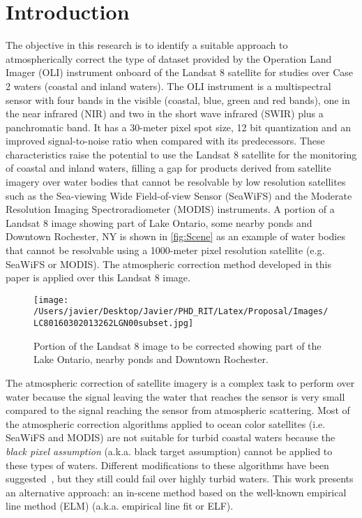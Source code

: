 \documentclass[]{spie}  %
\begin{document}
\section{Introduction} 
The objective in this research is to identify a suitable approach to atmospherically correct the type of dataset provided by the Operation Land Imager (OLI) instrument onboard of the Landsat 8 satellite for studies over Case 2 waters (coastal and inland waters). The OLI instrument is a multispectral sensor with four bands in the visible (coastal, blue, green and red bands), one in the near infrared (NIR) and two in the short wave infrared (SWIR) plus a panchromatic band. It has a 30-meter pixel spot size, 12 bit quantization and an improved signal-to-noise ratio when compared with its predecessors. These characteristics raise the potential to use the Landsat 8 satellite for the monitoring of coastal and inland waters, filling a gap for products derived from satellite imagery over water bodies that cannot be resolvable by low resolution satellites such as the Sea-viewing Wide Field-of-view Sensor (SeaWiFS) and the Moderate Resolution Imaging Spectroradiometer (MODIS) instruments. A portion of a Landsat 8 image showing part of Lake Ontario, some nearby ponds and Downtown Rochester, NY is shown in \autoref{fig:Scene} as an example of water bodies that cannot be resolvable using a 1000-meter pixel resolution satellite (e.g. SeaWiFS or MODIS). The atmospheric correction method developed in this paper is applied over this Landsat 8 image.

\begin{figure}[htb]
  	\centering
  	\texttt{[image: /Users/javier/Desktop/Javier/PHD\_RIT/Latex/Proposal/Images/LC80160302013262LGN00subset.jpg]}
  \caption{Portion of the Landsat 8 image to be corrected showing part of the Lake Ontario, nearby ponds and Downtown Rochester. \label{fig:Scene} } 
\end{figure}

The atmospheric correction of satellite imagery is a complex task to perform over water because the signal leaving the water that reaches the sensor is very small compared to the signal reaching the sensor from atmospheric scattering. Most of the atmospheric correction algorithms applied to ocean color satellites (i.e. SeaWiFS and MODIS) are not suitable for turbid coastal waters because the {\it black pixel assumption} (a.k.a. black target assumption) cannot be applied to these types of waters. Different modifications to these algorithms have been suggested~\cite{Patt2003}, but they still could fail over highly turbid waters. This work presents an alternative approach: an in-scene method based on the well-known empirical line method (ELM) (a.k.a. empirical line fit or ELF).
\end{document}
